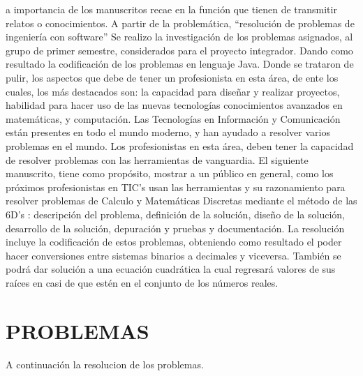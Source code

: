 \documentclass{IEEEcsmag}
\begin{document}
a importancia de los manuscritos recae en la función que tienen de transmitir relatos o
conocimientos. A partir de la problemática, “resolución de problemas de ingeniería con software” Se
realizo la investigación de los problemas asignados, al grupo de primer semestre, considerados para
el proyecto integrador. Dando como resultado la codificación de los problemas en lenguaje Java.
Donde se trataron de pulir, los aspectos que debe de tener un profesionista en esta área, de ente los
cuales, los más destacados son: la capacidad para diseñar y realizar proyectos, habilidad para hacer
uso de las nuevas tecnologías conocimientos avanzados en matemáticas, y computación.
Las Tecnologías en Información y Comunicación están presentes en todo el mundo moderno, y han
ayudado a resolver varios problemas en el mundo. Los profesionistas en esta área, deben tener la
capacidad de resolver problemas con las herramientas de vanguardia.
El siguiente manuscrito, tiene como propósito, mostrar a un público en general, como los próximos
profesionistas en TIC’s usan las herramientas y su razonamiento para resolver problemas de Calculo y
Matemáticas Discretas mediante el método de las 6D’s : descripción del problema, definición de la
solución, diseño de la solución, desarrollo de la solución, depuración y pruebas y documentación.
La resolución incluye la codificación de estos problemas, obteniendo como resultado el poder hacer
conversiones entre sistemas binarios a decimales y viceversa. También se podrá dar solución a una
ecuación cuadrática la cual regresará valores de sus raíces en casi de que estén en el conjunto de los
números reales.


\section{PROBLEMAS}
A continuación la resolucion de los problemas.
\end{document}
